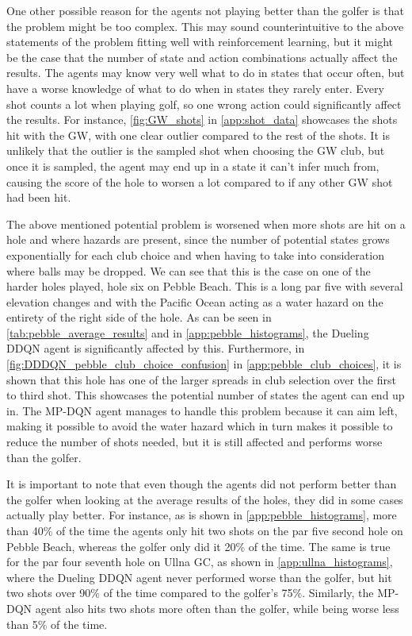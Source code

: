 \documentclass{kththesis}
\begin{document}
One other possible reason for the agents not playing better than the golfer is that the problem might be too complex. This may sound counterintuitive to the above statements of the problem fitting well with reinforcement learning, but it might be the case that the number of state and action combinations actually affect the results. The agents may know very well what to do in states that occur often, but have a worse knowledge of what to do when in states they rarely enter. Every shot counts a lot when playing golf, so one wrong action could significantly affect the results.  For instance, \autoref{fig:GW_shots} in \autoref{app:shot_data} showcases the shots hit with the GW, with one clear outlier compared to the rest of the shots. It is unlikely that the outlier is the sampled shot when choosing the GW club, but once it is sampled, the agent may end up in a state it can't infer much from, causing the score of the hole to worsen a lot compared to if any other GW shot had been hit.

The above mentioned potential problem is worsened when more shots are hit on a hole and where hazards are present, since the number of potential states grows exponentially for each club choice and when having to take into consideration where balls may be dropped. We can see that this is the case on one of the harder holes played, hole six on Pebble Beach. This is a long par five with several elevation changes and with the Pacific Ocean acting as a water hazard on the entirety of the right side of the hole. As can be seen in \autoref{tab:pebble_average_results} and in \autoref{app:pebble_histograms}, the Dueling DDQN agent is significantly affected by this. Furthermore, in \autoref{fig:DDDQN_pebble_club_choice_confusion} in \autoref{app:pebble_club_choices}, it is shown that this hole has one of the larger spreads in club selection over the first to third shot. This showcases the potential number of states the agent can end up in. The MP-DQN agent manages to handle this problem because it can aim left, making it possible to avoid the water hazard which in turn makes it possible to reduce the number of shots needed, but it is still affected and performs worse than the golfer. 

It is important to note that even though the agents did not perform better than the golfer when looking at the average results of the holes, they did in some cases actually play better. For instance, as is shown in \autoref{app:pebble_histograms}, more than 40\% of the time the agents only hit two shots on the par five second hole on Pebble Beach, whereas the golfer only did it 20\% of the time. The same is true for the par four seventh hole on Ullna GC, as shown in \autoref{app:ullna_histograms}, where the Dueling DDQN agent never performed worse than the golfer, but hit two shots over 90\% of the time compared to the golfer's 75\%. Similarly, the MP-DQN agent also hits two shots more often than the golfer, while being worse less than 5\% of the time. 
\end{document}
